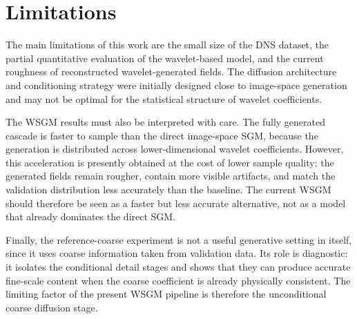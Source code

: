 \section{Limitations}

The main limitations of this work are the small size of the DNS dataset, the
partial quantitative evaluation of the wavelet-based model, and the current
roughness of reconstructed wavelet-generated fields. The diffusion architecture
and conditioning strategy were initially designed close to image-space
generation and may not be optimal for the statistical structure of wavelet
coefficients.

The WSGM results must also be interpreted with care. The fully generated
cascade is faster to sample than the direct image-space SGM, because the
generation is distributed across lower-dimensional wavelet coefficients.
However, this acceleration is presently obtained at the cost of lower sample
quality: the generated fields remain rougher, contain more visible artifacts,
and match the validation distribution less accurately than the baseline. The
current WSGM should therefore be seen as a faster but less accurate alternative,
not as a model that already dominates the direct SGM.

Finally, the reference-coarse experiment is not a useful generative setting in
itself, since it uses coarse information taken from validation data. Its role is
diagnostic: it isolates the conditional detail stages and shows that they can
produce accurate fine-scale content when the coarse coefficient is already
physically consistent. The limiting factor of the present WSGM pipeline is
therefore the unconditional coarse diffusion stage.
